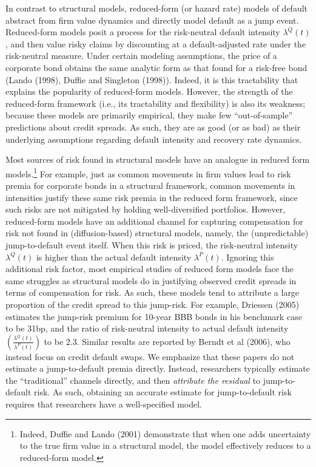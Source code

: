 \documentclass[titlepage,11pt]{article}
\begin{document}
In contrast to structural models, reduced-form (or hazard rate)
models of default abstract from firm value dynamics and directly
model default as a jump event.  Reduced-form models posit a process
for the risk-neutral default intensity $\lambda^{Q}(t)$, and then value risky claims
by discounting at a default-adjusted rate under the risk-neutral
measure.  Under certain modeling assumptions, the price of a corporate
bond obtains the same analytic form as that found for a risk-free bond
(Lando (1998), Duffie and Singleton (1998)).  Indeed, it is this tractability
that explains the popularity of reduced-form models. However, the strength
of the reduced-form framework (i.e., its tractability and flexibility) is also its
weakness; because these models are primarily empirical, they make
few ``out-of-sample'' predictions about credit spreads. As such, they are as
good (or as bad) as their underlying assumptions regarding default intensity
and recovery rate dynamics.

Most sources of risk found in structural models have an analogue in
reduced form models.\footnote{Indeed, Duffie and Lando (2001)
demonstrate that when one adds uncertainty to the true firm value in
a structural model, the model effectively reduces to a reduced-form
model.} For example, just as common movements in firm values lead to
risk premia for corporate bonds in a structural
framework, common movements in intensities justify these same risk premia
in the reduced form framework, since such risks are not mitigated by
holding well-diversified portfolios. However, reduced-form models
have an additional channel for capturing compensation for risk not
found in (diffusion-based) structural models, namely, the
(unpredictable) jump-to-default event itself. When this risk is priced, the
risk-neutral intensity $\lambda^{Q}(t)$ is higher than the actual default intensity
$\lambda^{P}(t)$. Ignoring this additional risk factor, most empirical studies of
reduced form models face the same struggles as structural models do in justifying
observed credit spreads in terms of compensation for risk.
As such, these models tend to attribute a large proportion of the
credit spread to this jump-risk. For example, Driessen (2005)
estimates the jump-risk premium for 10-year BBB bonds in his
benchmark case to be 31bp, and the ratio of risk-neutral intensity to actual
default intensity $\left(\frac{\lambda^{Q}(t)}{\lambda^{P}(t)} \right)$ to be 2.3.
Similar results are reported by Berndt et al (2006), who instead
focus on credit default swaps.  We emphasize that these papers do not
estimate a jump-to-default premia directly.
Instead, researchers typically estimate the ``traditional'' channels directly,
and then {\em attribute the residual} to jump-to-default risk.  As such, obtaining an
accurate estimate for jump-to-default risk requires that researchers have a well-specified model.
\end{document}
